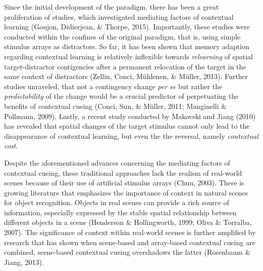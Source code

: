 \documentclass[
  man,floatsintext]{apa7}
\begin{document}
Since the initial development of the paradigm, there has been a great proliferation of studies, which investigated mediating factors of contextual learning (Goujon, Didierjean, \& Thorpe, 2015). Importantly, these studies were conducted within the confines of the original paradigm, that is, using simple stimulus arrays as distractors. So far, it has been shown that memory adaption regarding contextual learning is relatively inflexible towards \emph{relearning} of spatial target-distractor contigencies after a permanent relocation of the target in the same context of distractors (Zellin, Conci, Mühlenen, \& Müller, 2013). Further studies unraveled, that not a contingency change \emph{per se} but rather the \emph{predictability} of the change would be a crucial predictor of perpetuating the benefits of contextual cueing (Conci, Sun, \& Müller, 2011; Manginelli \& Pollmann, 2009). Lastly, a recent study conducted by Makovski and Jiang (2010) has revealed that spatial changes of the target stimulus cannot only lead to the disappearance of contextual learning, but even the the reversal, namely \emph{contextual cost}.

Despite the aforementioned advances concerning the mediating factors of contextual cueing, these traditional approaches lack the realism of real-world scenes because of their use of artificial stimulus arrays (Chun, 2003). There is growing literature that emphasizes the importance of context in natural scenes for object recognition. Objects in real scenes can provide a rich source of information, especially expressed by the stable spatial relationship between different objects in a scene (Henderson \& Hollingworth, 1999; Oliva \& Torralba, 2007). The significance of context within real-world scenes is further amplified by research that has shown when scene-based and array-based contextual cueing are combined, scene-based contextual cueing overshadows the latter (Rosenbaum \& Jiang, 2013).
\end{document}
